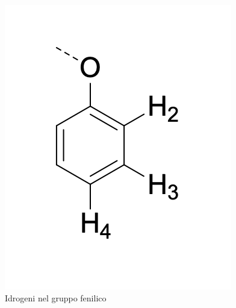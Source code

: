 \begin{figure}[h!]
    \centering
    \includegraphics[scale=0.8]{Relazione/foto/cohidro.png}
    \caption{Idrogeni nel gruppo fenilico }
    \label{fig:enter-label}
\end{figure}
